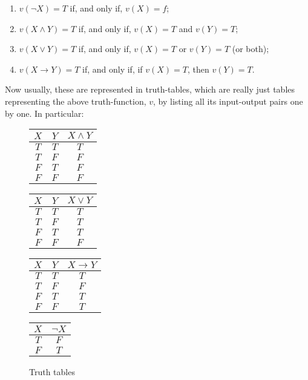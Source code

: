 \begin{enumerate}
	\item $v(\neg X)=T$ if, and only if, $v(X)=f$;
	\item $v(X \wedge Y)=T$ if, and only if, $v(X)=T$ and $v(Y)=T$;
	\item $v(X \vee Y)=T$ if, and only if, $v(X)=T$ or $v(Y)=T$ (or both);
	\item $v(X \rightarrow Y)=T$ if, and only if, if $v(X)=T$, then $v(Y)=T$. 
\end{enumerate}

Now usually, these are represented in truth-tables, which are really just tables representing the above truth-function, $v$, by listing all its input-output pairs one by one. In particular:

\begin{figure}[h]
\begin{center}
\begin{minipage}{0.25\textwidth}
\begin{tabular}{|c|c|c|}
	\hline
	$X$ & $Y$ & $X \wedge Y$\\ \hline
	$T$ & $T$ & $T$\\
	$T$ & $F$ & $F$\\
	$F$ & $T$ & $F$\\
	$F$ & $F$ & $F$\\ \hline
\end{tabular}
\end{minipage}
%
\begin{minipage}{0.25\textwidth}
\begin{tabular}{|c|c|c|}
	\hline
	$X$ & $Y$ & $X \vee Y$\\ \hline
	$T$ & $T$ & $T$\\
	$T$ & $F$ & $T$\\
	$F$ & $T$ & $T$\\
	$F$ & $F$ & $F$\\\hline
\end{tabular}
\end{minipage}
%
\begin{minipage}{0.25\textwidth}
\begin{tabular}{|c|c|c|}
	\hline
	$X$ & $Y$ & $X \rightarrow Y$\\ \hline
	$T$ & $T$ & $T$\\
	$T$ & $F$ & $F$\\
	$F$ & $T$ & $T$\\
	$F$ & $F$ & $T$\\ \hline
\end{tabular}
\end{minipage}
%
\begin{minipage}{0.20\textwidth}
\begin{tabular}{|c|c|}
	\hline
	$X$ & $\neg X$\\ \hline
	$T$ & $F$\\
	$F$ & $T$\\ \hline
\end{tabular}
\end{minipage}
\end{center}
\caption{Truth tables}
\label{tto}
\end{figure}

